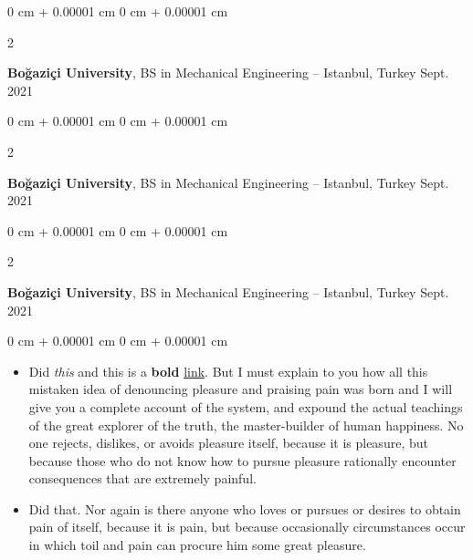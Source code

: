 \documentclass[10pt, letterpaper]{article}
\newenvironment{highlights}{
    \begin{itemize}[
        topsep=0.10 cm,
        parsep=0.10 cm,
        partopsep=0pt,
        itemsep=0pt,
        leftmargin=0 cm + 10pt
    ]
}{
    \end{itemize}
} %
\newenvironment{onecolentry}{
    \begin{adjustwidth}{
        0 cm + 0.00001 cm
    }{
        0 cm + 0.00001 cm
    }
}{
    \end{adjustwidth}
} %
\newenvironment{twocolentry}[2][]{
    \onecolentry
    \def\secondColumn{#2}
    \setcolumnwidth{\fill, 4.5 cm}
    \begin{paracol}{2}
}{
    \switchcolumn \raggedleft \secondColumn
    \end{paracol}
    \endonecolentry
} %
\begin{document}
        \vspace{0.2 cm}

        \begin{twocolentry}{
            Sept. 2021
        }
            \textbf{Boğaziçi University}, BS in Mechanical Engineering -- Istanbul, Turkey\end{twocolentry}



        \vspace{0.2 cm}

        \begin{twocolentry}{
            Sept. 2021
        }
            \textbf{Boğaziçi University}, BS in Mechanical Engineering -- Istanbul, Turkey\end{twocolentry}



        \vspace{0.2 cm}

        \begin{twocolentry}{
            Sept. 2021
        }
            \textbf{Boğaziçi University}, BS in Mechanical Engineering -- Istanbul, Turkey\end{twocolentry}

        \vspace{0.10 cm}
        \begin{onecolentry}
            \begin{highlights}
                \item Did \textit{this} and this is a \textbf{bold} \href{https://example.com}{link}. But I must explain to you how all this mistaken idea of denouncing pleasure and praising pain was born and I will give you a complete account of the system, and expound the actual teachings of the great explorer of the truth, the master-builder of human happiness. No one rejects, dislikes, or avoids pleasure itself, because it is pleasure, but because those who do not know how to pursue pleasure rationally encounter consequences that are extremely painful.
                \item Did that. Nor again is there anyone who loves or pursues or desires to obtain pain of itself, because it is pain, but because occasionally circumstances occur in which toil and pain can procure him some great pleasure.
            \end{highlights}
        \end{onecolentry}


        \vspace{0.2 cm}
\end{document}
